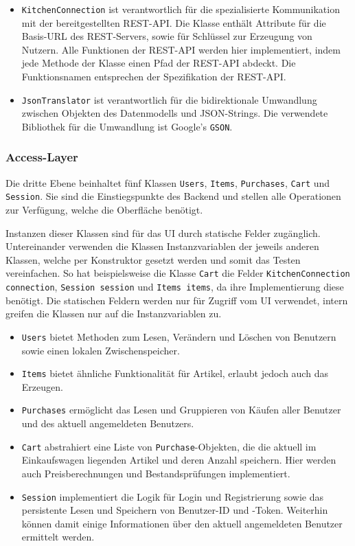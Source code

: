 \begin{itemize}
	\item  \texttt{KitchenConnection} ist verantwortlich für die spezialisierte Kommunikation mit der bereitgestellten REST-API. Die Klasse enthält Attribute für die Basis-URL des REST-Servers, sowie für Schlüssel zur Erzeugung von Nutzern.
	Alle Funktionen der REST-API werden hier implementiert, indem jede Methode der Klasse einen Pfad der REST-API abdeckt.
	Die Funktionsnamen entsprechen der Spezifikation der REST-API\@.

	\item \texttt{JsonTranslator} ist verantwortlich für die bidirektionale Umwandlung zwischen Objekten des Datenmodells und JSON-Strings.
	Die verwendete Bibliothek für die Umwandlung ist Google's \texttt{GSON}.
\end{itemize}

\subsubsection{Access-Layer} \label{subsubsec:access-layer}

Die dritte Ebene beinhaltet fünf Klassen \texttt{Users}, \texttt{Items}, \texttt{Purchases}, \texttt{Cart} und \texttt{Session}.
Sie sind die Einstiegspunkte des Backend und stellen alle Operationen zur Verfügung, welche die Oberfläche benötigt.

Instanzen dieser Klassen sind für das UI durch statische Felder zugänglich.
Untereinander verwenden die Klassen Instanzvariablen der jeweils anderen Klassen, welche per Konstruktor gesetzt werden und somit das Testen vereinfachen.
So hat beispielsweise die Klasse \texttt{Cart} die Felder \texttt{KitchenConnection connection}, \texttt{Session session} und \texttt{Items items}, da ihre Implementierung diese benötigt.
Die statischen Feldern werden nur für Zugriff vom UI verwendet, intern greifen die Klassen nur auf die Instanzvariablen zu.

\begin{itemize}
	\item \texttt{Users} bietet Methoden zum Lesen, Verändern und Löschen von Benutzern sowie einen lokalen Zwischenspeicher.
	\item \texttt{Items} bietet ähnliche Funktionalität für Artikel, erlaubt jedoch auch das Erzeugen.
	\item \texttt{Purchases} ermöglicht das Lesen und Gruppieren von Käufen aller Benutzer und des aktuell angemeldeten Benutzers.
	\item \texttt{Cart} abstrahiert eine Liste von \texttt{Purchase}-Objekten, die die aktuell im Einkaufswagen liegenden Artikel und deren Anzahl speichern.
	Hier werden auch Preisberechnungen und Bestandsprüfungen implementiert.
	\item \texttt{Session} implementiert die Logik für Login und Registrierung sowie das persistente Lesen und Speichern von Benutzer-ID und -Token.
	Weiterhin können damit einige Informationen über den aktuell angemeldeten Benutzer ermittelt werden.
\end{itemize}

